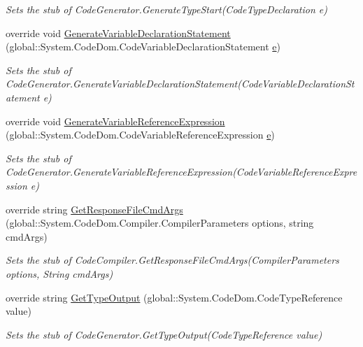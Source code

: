 \begin{DoxyCompactItemize}
\begin{DoxyCompactList}\small\item\em Sets the stub of Code\-Generator.\-Generate\-Type\-Start(\-Code\-Type\-Declaration e)\end{DoxyCompactList}\item 
override void \hyperlink{class_system_1_1_code_dom_1_1_compiler_1_1_fakes_1_1_stub_code_compiler_a68f6bb4ce97eb9ef12537e5f44b590c2}{Generate\-Variable\-Declaration\-Statement} (global\-::\-System.\-Code\-Dom.\-Code\-Variable\-Declaration\-Statement \hyperlink{jquery-1_810_82_8min_8js_a2c038346d47955cbe2cb91e338edd7e1}{e})
\begin{DoxyCompactList}\small\item\em Sets the stub of Code\-Generator.\-Generate\-Variable\-Declaration\-Statement(\-Code\-Variable\-Declaration\-Statement e)\end{DoxyCompactList}\item 
override void \hyperlink{class_system_1_1_code_dom_1_1_compiler_1_1_fakes_1_1_stub_code_compiler_ae232238ef2cd87878c2970af0300cd6d}{Generate\-Variable\-Reference\-Expression} (global\-::\-System.\-Code\-Dom.\-Code\-Variable\-Reference\-Expression \hyperlink{jquery-1_810_82_8min_8js_a2c038346d47955cbe2cb91e338edd7e1}{e})
\begin{DoxyCompactList}\small\item\em Sets the stub of Code\-Generator.\-Generate\-Variable\-Reference\-Expression(\-Code\-Variable\-Reference\-Expression e)\end{DoxyCompactList}\item 
override string \hyperlink{class_system_1_1_code_dom_1_1_compiler_1_1_fakes_1_1_stub_code_compiler_a2e20133f2af05fcd1816e422bebe4cbb}{Get\-Response\-File\-Cmd\-Args} (global\-::\-System.\-Code\-Dom.\-Compiler.\-Compiler\-Parameters options, string cmd\-Args)
\begin{DoxyCompactList}\small\item\em Sets the stub of Code\-Compiler.\-Get\-Response\-File\-Cmd\-Args(\-Compiler\-Parameters options, String cmd\-Args)\end{DoxyCompactList}\item 
override string \hyperlink{class_system_1_1_code_dom_1_1_compiler_1_1_fakes_1_1_stub_code_compiler_a6b0060138080249d0c25f97078ace788}{Get\-Type\-Output} (global\-::\-System.\-Code\-Dom.\-Code\-Type\-Reference value)
\begin{DoxyCompactList}\small\item\em Sets the stub of Code\-Generator.\-Get\-Type\-Output(\-Code\-Type\-Reference value)\end{DoxyCompactList}\item 

\end{DoxyCompactItemize}
